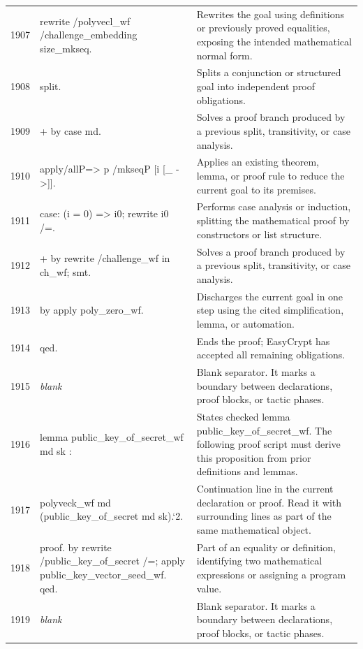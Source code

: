 \documentclass[10pt]{article}
\begin{document}
\begin{longtable}{r L{0.53\textwidth} L{0.37\textwidth}}
1907 & {\ttfamily\scriptsize rewrite /polyvecl\_wf /challenge\_embedding size\_mkseq.} & Rewrites the goal using definitions or previously proved equalities, exposing the intended mathematical normal form. \\
1908 & {\ttfamily\scriptsize split.} & Splits a conjunction or structured goal into independent proof obligations. \\
1909 & {\ttfamily\scriptsize + by case md.} & Solves a proof branch produced by a previous split, transitivity, or case analysis. \\
1910 & {\ttfamily\scriptsize apply/allP=> p /mkseqP [i [\_ ->]].} & Applies an existing theorem, lemma, or proof rule to reduce the current goal to its premises. \\
1911 & {\ttfamily\scriptsize case: (i = 0) => i0; rewrite i0 /=.} & Performs case analysis or induction, splitting the mathematical proof by constructors or list structure. \\
1912 & {\ttfamily\scriptsize + by rewrite /challenge\_wf in ch\_wf; smt.} & Solves a proof branch produced by a previous split, transitivity, or case analysis. \\
1913 & {\ttfamily\scriptsize by apply poly\_zero\_wf.} & Discharges the current goal in one step using the cited simplification, lemma, or automation. \\
1914 & {\ttfamily\scriptsize qed.} & Ends the proof; EasyCrypt has accepted all remaining obligations. \\
1915 & {\ttfamily\scriptsize \emph{blank}} & Blank separator.  It marks a boundary between declarations, proof blocks, or tactic phases. \\
1916 & {\ttfamily\scriptsize lemma public\_key\_of\_secret\_wf md sk :} & States checked lemma public\_key\_of\_secret\_wf.  The following proof script must derive this proposition from prior definitions and lemmas. \\
1917 & {\ttfamily\scriptsize   polyveck\_wf md (public\_key\_of\_secret md sk).`2.} & Continuation line in the current declaration or proof.  Read it with surrounding lines as part of the same mathematical object. \\
1918 & {\ttfamily\scriptsize proof. by rewrite /public\_key\_of\_secret /=; apply public\_key\_vector\_seed\_wf. qed.} & Part of an equality or definition, identifying two mathematical expressions or assigning a program value. \\
1919 & {\ttfamily\scriptsize \emph{blank}} & Blank separator.  It marks a boundary between declarations, proof blocks, or tactic phases. \\

\end{longtable}
\end{document}
